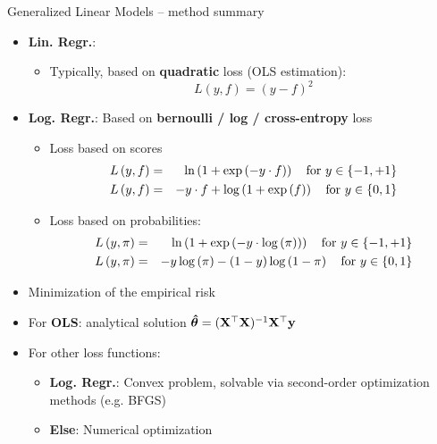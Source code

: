\begin{vbframe}{Generalized Linear Models -- method summary}
\framebreak


\begin{itemize}
  \item \textbf{Lin. Regr.}:
  \begin{itemize}
    
    \item Typically, based on \textbf{quadratic} loss (OLS estimation): 
    $$L\left(y, f\right) = \left(y - f \right)^2$$ %
  \end{itemize}
  \item \textbf{Log. Regr.}: Based on \textbf{bernoulli / log / cross-entropy} loss ~ 
  \begin{itemize}
      \item Loss based on scores
      \begin{eqnarray*}
    L\left(y, f\right) &=& \ln\left(1+\exp\left(-y \cdot f\right)\right) \quad \text{for } y \in \{-1, +1\}\\
    L\left(y, f\right) &=& - y \cdot f + \log\left(1 + \exp\left(f\right)\right) \quad \text{for } y \in \{0, 1\} 
    \end{eqnarray*}
    \item Loss based on probabilities:
      \begin{eqnarray*}
    L\left(y, \pi\right) &=& \ln\left(1+\exp\left(-y \cdot \log \left(\pi\right)\right)\right) \quad \text{for } y \in \{-1, +1\}\\
    L\left(y, \pi\right) &=& -y \log \left(\pi\right) - (1 - y) \log \left(1 - \pi \right)  \quad \text{for } y \in \{0, 1\} 
    \end{eqnarray*}
  \end{itemize}
\end{itemize}

\framebreak

\medskip


\begin{itemize}
    \item Minimization of the empirical risk
    \item For \textbf{OLS}: analytical solution $\bm{\hat\theta} = (\mathbf{X}^\top \mathbf{X})^{-1} \mathbf{X}^\top \mathbf{y}$
    \item For other loss functions: 
    \begin{itemize}
        \item \textbf{Log. Regr.}: Convex problem, solvable via second-order optimization methods (e.g. BFGS)
        \item \textbf{Else}: Numerical optimization 
    \end{itemize}
    

\end{itemize}
\end{vbframe}
